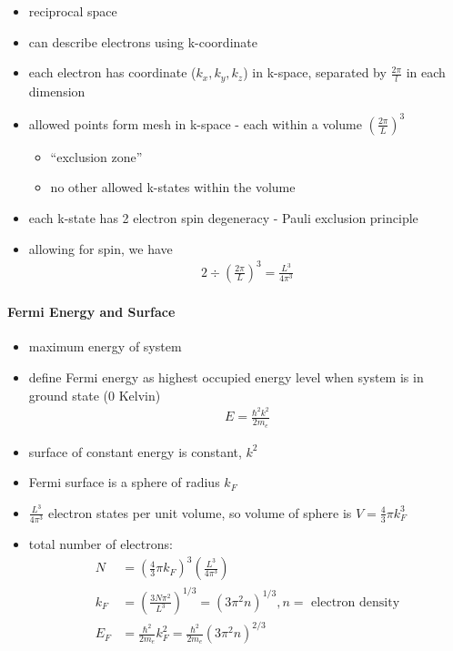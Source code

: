 \documentclass[a4paper,11pt,normalem]{article}
\begin{document}
\begin{itemize}
    \item reciprocal space
    \item can describe electrons using k-coordinate
    \item each electron has coordinate (\(k_x,k_y,k_z\)) in k-space, separated by \(\frac{2\pi}{l}\) in each dimension
    \item allowed points form mesh in k-space - each within a volume \(\left(\frac{2\pi}{L}\right)^3\)
        \begin{itemize}
            \item ``exclusion zone''
            \item no other allowed k-states within the volume
        \end{itemize}
    \item each k-state has 2 electron spin degeneracy - Pauli exclusion principle
    \item allowing for spin, we have
        \begin{align*}
            2\div\left(\frac{2\pi}{L}\right)^3 = \frac{L^3}{4\pi^3}
        \end{align*}
\end{itemize}

\paragraph{Fermi Energy and Surface}

\begin{itemize}
    \item maximum energy of system
    \item define Fermi energy as highest occupied energy level when system is in ground state (0 Kelvin)
        \begin{align*}
            E = \frac{\hbar^2k^2}{2m_e}
        \end{align*}
    \item surface of constant energy is constant, \(k^2\)
    \item Fermi surface is a sphere of radius \(k_F\)
    \item \(\frac{L^3}{4\pi^3}\) electron states per unit volume, so volume of sphere is \(V = \frac{4}{3}\pi k_F^3\)
    \item total number of electrons:
        \begin{align*}
            N &= \left(\frac{4}{3}\pi k_F\right)^3\left(\frac{L^3}{4\pi^3}\right) \\
            k_F &= \left(\frac{3N\pi^2}{L^3}\right)^{1/3} = (3\pi^2n)^{1/3}, n = \text{ electron density}\\
            E_F &= \frac{\hbar^2}{2m_e}k_F^2 = \frac{\hbar^2}{2m_e}(3\pi^2n)^{2/3}\\
        \end{align*}
\end{itemize}
\end{document}
